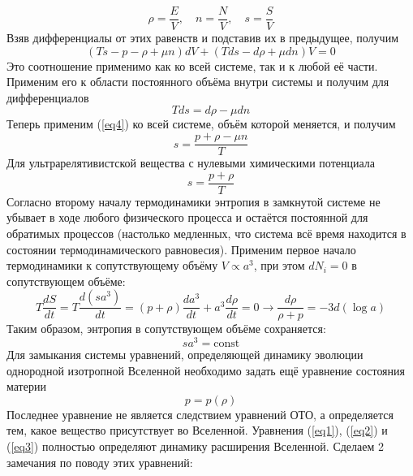 \documentclass[12pt]{article}
\theoremstyle{definition}
\begin{document}
\begin{equation}
    \rho=\frac{E}{V},\quad n=\frac{N}{V},\quad s=\frac{S}{V}
\end{equation}
Взяв дифференциалы от этих равенств и подставив их в предыдущее, получим
\begin{equation}\label{eq4}
    (Ts-p-\rho+\mu n)dV+(Tds-d\rho+\mu dn)V=0
\end{equation}
Это соотношение применимо как ко всей системе, так и к любой её части. Применим его к области постоянного объёма внутри системы и получим для дифференциалов
\begin{equation}
    Tds=d\rho-\mu dn
\end{equation}
Теперь применим (\ref{eq4}) ко всей системе, объём которой меняется, и получим
\begin{equation}
    s=\frac{p+\rho-\mu n}{T}
\end{equation}
Для ультрарелятивистской вещества с нулевыми химическими потенциала
\begin{equation}
    s=\frac{p+\rho}{T}
\end{equation}
Согласно второму началу термодинамики энтропия в замкнутой системе не убывает в ходе любого физического процесса и остаётся постоянной для обратимых процессов (настолько медленных, что система всё время находится в состоянии термодинамического равновесия). Применим первое начало термодинамики к сопутствующему объёму $V\propto a^3$, при этом $dN_i=0$ в сопутствующем объёме:
\begin{equation}
    T\frac{dS}{dt}=T\frac{d(sa^3)}{dt}=(p+\rho)\frac{da^3}{dt}+a^3\frac{d\rho}{dt}=0\rightarrow \frac{d\rho}{\rho+p}=-3d(\log a)
\end{equation}
Таким образом, энтропия в сопутствующем объёме сохраняется:
\begin{equation}
    \boxed{sa^3=\text{const}}
\end{equation}
Для замыкания системы уравнений, определяющей динамику эволюции однородной изотропной Вселенной необходимо задать ещё уравнение состояния материи
\begin{equation}\label{eq3}
    p=p(\rho)
\end{equation}
Последнее уравнение не является следствием уравнений ОТО, а определяется тем, какое вещество присутствует во Вселенной. Уравнения (\ref{eq1}), (\ref{eq2}) и (\ref{eq3}) полностью определяют динамику расширения Вселенной. Сделаем 2 замечания по поводу этих уравнений:
\end{document}
